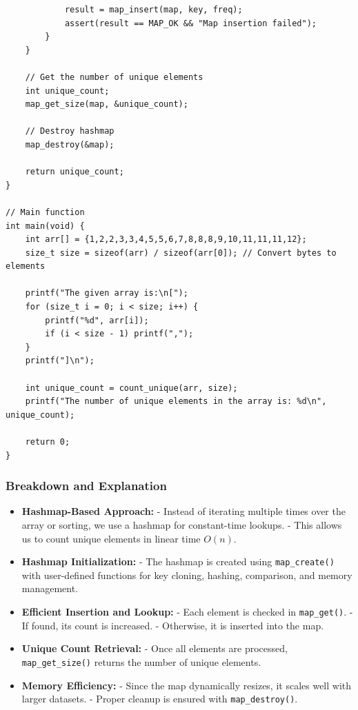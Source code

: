 \documentclass[titlepage]{article}
\begin{document}
\begin{verbatim}
            result = map_insert(map, key, freq);
            assert(result == MAP_OK && "Map insertion failed");
        }
    }

    // Get the number of unique elements
    int unique_count;
    map_get_size(map, &unique_count);

    // Destroy hashmap
    map_destroy(&map);

    return unique_count;
}

// Main function
int main(void) {
    int arr[] = {1,2,2,3,3,4,5,5,6,7,8,8,8,9,10,11,11,11,12};
    size_t size = sizeof(arr) / sizeof(arr[0]); // Convert bytes to elements

    printf("The given array is:\n[");
    for (size_t i = 0; i < size; i++) {
        printf("%d", arr[i]);
        if (i < size - 1) printf(",");
    }
    printf("]\n");

    int unique_count = count_unique(arr, size);
    printf("The number of unique elements in the array is: %d\n", unique_count);

    return 0;
}
\end{verbatim}

\subsubsection{Breakdown and Explanation}
\begin{itemize}
    \item \textbf{Hashmap-Based Approach:}
        - Instead of iterating multiple times over the array or sorting, we use a hashmap for constant-time lookups.
        - This allows us to count unique elements in linear time $O(n)$.
    \item \textbf{Hashmap Initialization:}
        - The hashmap is created using \texttt{map\_create()} with user-defined functions for key cloning, hashing, comparison, and memory management.
    \item \textbf{Efficient Insertion and Lookup:}
        - Each element is checked in \texttt{map\_get()}.
        - If found, its count is increased.
        - Otherwise, it is inserted into the map.
    \item \textbf{Unique Count Retrieval:}
        - Once all elements are processed, \texttt{map\_get\_size()} returns the number of unique elements.
    \item \textbf{Memory Efficiency:}
        - Since the map dynamically resizes, it scales well with larger datasets.
        - Proper cleanup is ensured with \texttt{map\_destroy()}.
\end{itemize}
\end{document}
